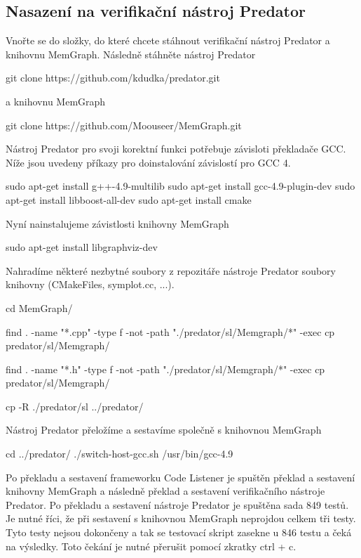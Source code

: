\subsection*{Nasazení na verifikační nástroj Predator}

Vnořte se do složky, do které chcete stáhnout verifikační nástroj Predator a knihovnu Mem\+Graph. Následně stáhněte nástroj Predator \begin{DoxyVerb}git clone https://github.com/kdudka/predator.git
\end{DoxyVerb}


a knihovnu Mem\+Graph \begin{DoxyVerb}git clone https://github.com/Moouseer/MemGraph.git
\end{DoxyVerb}


Nástroj Predator pro svoji korektní funkci potřebuje závisloti překladače G\+CC. Níže jsou uvedeny příkazy pro doinstalování závislostí pro G\+CC 4. \begin{DoxyVerb}sudo apt-get install g++-4.9-multilib
sudo apt-get install gcc-4.9-plugin-dev
sudo apt-get install libboost-all-dev
sudo apt-get install cmake
\end{DoxyVerb}


Nyní nainstalujeme závistlosti knihovny Mem\+Graph \begin{DoxyVerb}sudo apt-get install libgraphviz-dev
\end{DoxyVerb}


Nahradíme některé nezbytné soubory z repozitáře nástroje Predator soubory knihovny (C\+Make\+Files, symplot.\+cc, ...). \begin{DoxyVerb}cd MemGraph/

find . -name "*.cpp" -type f -not -path "./predator/sl/Memgraph/*" -exec cp {} predator/sl/Memgraph/ \;

find . -name "*.h" -type f -not -path "./predator/sl/Memgraph/*" -exec cp {} predator/sl/Memgraph/ \;

cp -R ./predator/sl ../predator/
\end{DoxyVerb}


Nástroj Predator přeložíme a sestavíme společně s knihovnou Mem\+Graph \begin{DoxyVerb}cd ../predator/
./switch-host-gcc.sh /usr/bin/gcc-4.9
\end{DoxyVerb}


Po překladu a sestavení frameworku Code Listener je spuštěn překlad a sestavení knihovny Mem\+Graph a následně překlad a sestavení verifikačního nástroje Predator. Po překladu a sestavení nástroje Predator je spuštěna sada 849 testů. Je nutné říci, že při sestavení s knihovnou Mem\+Graph neprojdou celkem tři testy. Tyto testy nejsou dokončeny a tak se testovací skript zasekne u 846 testu a čeká na výsledky. Toto čekání je nutné přerušit pomocí zkratky ctrl + c.

